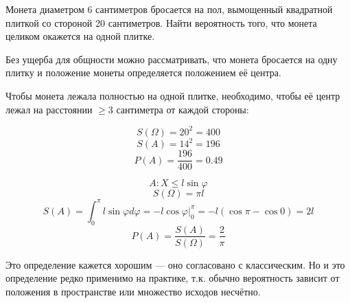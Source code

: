 \begin{example}
    Монета диаметром 6 сантиметров бросается на пол, вымощенный квадратной плиткой со стороной 20 сантиметров. Найти вероятность того, что монета целиком окажется на одной плитке.

    Без ущерба для общности можно рассматривать, что монета бросается на одну плитку и положение монеты определяется положением её центра.

    Чтобы монета лежала полностью на одной плитке, необходимо, чтобы её центр лежал на расстоянии \( \geq 3\) сантиметра от каждой стороны:

    \begin{figure}[h]
        \centering
        
    \end{figure}

    \[S(\Omega) = 20^2 = 400\]
    \[S(A) = 14^2 = 196\]
    \[P(A) = \frac{196}{400} = 0.49\]
\end{example}

\begin{example}
    \? %

    \[A : X \leq l \sin \varphi\]
    \[S(\Omega) = \pi l\]
    \[S(A) = \int_0^\pi l \sin \varphi d\varphi = - l \cos \varphi \Big|_0^\pi = - l(\cos \pi - \cos 0) = 2l\]
    \[P(A) = \frac{S(A)}{S(\Omega)} = \frac{2}{\pi}\]
\end{example}

Это определение кажется хорошим --- оно согласовано с классическим. Но и это определение редко применимо на практике, т.к. обычно вероятность зависит от положения в пространстве или множество исходов несчётно.
